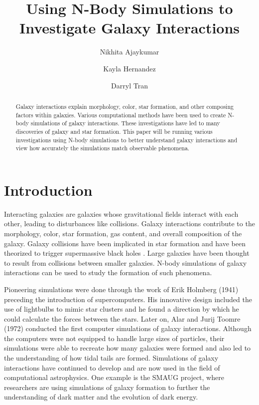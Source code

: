 \documentclass[linenumbers,RNAAS,trackchanges]{aastex631}
\begin{document}
\title{Using N-Body Simulations to Investigate Galaxy Interactions}
\correspondingauthor{}
\author{Nikhita Ajaykumar}

\author{Kayla Hernandez}


\author{Darryl Tran}

\begin{abstract}
Galaxy interactions explain morphology, color, star formation, and other composing factors within galaxies. Various computational methods have been used to create N-body simulations of galaxy interactions. These investigations have led to many discoveries of galaxy and star formation. This paper will be running various investigations using N-body simulations to better understand galaxy interactions and view how accurately the simulations match observable phenomena. 
\end{abstract}

\section{Introduction} \label{sec:intro}
Interacting galaxies are galaxies whose gravitational fields interact with each other, leading to disturbances like collisions. Galaxy interactions contribute to the morphology, color, star formation, gas content, and overall composition of the galaxy\cite{das}. Galaxy collisions have been implicated in star formation and have been theorized to trigger supermassive black holes \cite{das} \cite{goulding}. Large galaxies have been thought to result from collisions between smaller galaxies. N-body simulations of galaxy interactions can be used to study the formation of such phenomena.

Pioneering simulations were done through the work of Erik Holmberg (1941) preceding the introduction of supercomputers.\cite{nbod} His innovative design included the use of lightbulbs to mimic star clusters and he found a direction by which he could calculate the forces between the stars.\cite{nbod} Later on, Alar and Jurij Toomre (1972) conducted the first computer simulations of galaxy interactions.\cite{nbod} Although the computers were not equipped to handle large sizes of particles, their simulations were able to recreate how many galaxies were formed and also led to the understanding of how tidal tails are formed.\cite{nbod} Simulations of galaxy interactions have continued to develop and are now used in the field of computational astrophysics. One example is the SMAUG project, where researchers are using simulations of galaxy formation to further the understanding of dark matter and the evolution of dark energy. \cite{smaug}
\end{document}
